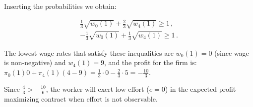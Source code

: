 \documentclass{article}
\begin{document}
Inserting the probabilities we obtain:

\begin{gather*}
  \tfrac13 \sqrt{w_0(1)} + \tfrac23 \sqrt{w_4(1)} \geq 1  \, ,\\
   -\tfrac13 \sqrt{w_0(1)} + \tfrac13 \sqrt{w_4(1)} \geq 1  \, .
\end{gather*}

The lowest wage rates that satisfy these inequalities are $w_0(1) = 0$ (since wage is non-negative) and $w_4(1) = 9$, and the profit for the firm is: $\pi_0(1)0 + \pi_4(1) \left( 4 - 9 \right) = \tfrac13 \cdot 0 - \tfrac23 \cdot 5 = - \tfrac{10}3$.

Since $\tfrac43 > - \tfrac{10}6$, the worker will exert low effort ($e=0$) in the expected profit-maximizing contract when effort is not observable.
\end{document}
